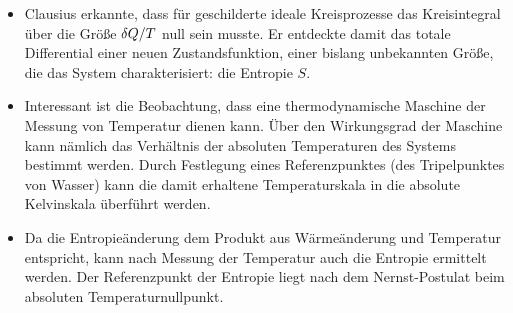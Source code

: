 \begin{itemize}
    \item Clausius erkannte, dass für geschilderte ideale Kreisprozesse das Kreisintegral über die Größe $\mathop{}\!\delta Q/T$ null sein musste. Er entdeckte damit das totale Differential einer neuen Zustandsfunktion, einer bislang unbekannten Größe, die das System charakterisiert: die Entropie $S$.  
    \item Interessant ist die Beobachtung, dass eine thermodynamische Maschine der Messung von Temperatur dienen kann. 
    Über den Wirkungsgrad der Maschine kann nämlich das Verhältnis der absoluten Temperaturen des Systems bestimmt werden. Durch Festlegung eines Referenzpunktes (des Tripelpunktes von Wasser) kann die damit erhaltene Temperaturskala in die absolute Kelvinskala überführt werden.
    \item Da die Entropieänderung dem Produkt aus Wärmeänderung und Temperatur entspricht, kann nach Messung der Temperatur auch die Entropie ermittelt werden. Der Referenzpunkt der Entropie liegt nach dem Nernst-Postulat beim absoluten Temperaturnullpunkt.
\end{itemize}
